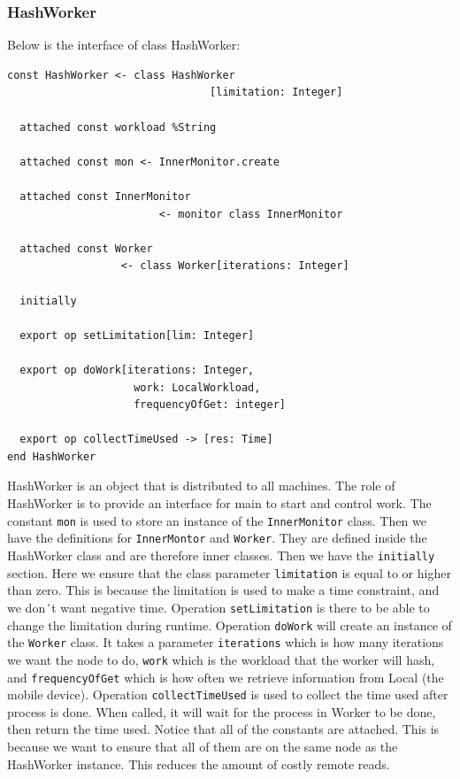 \subsubsection{HashWorker}
Below is the interface of class HashWorker:
\begin{lstlisting}[language=emerald]
const HashWorker <- class HashWorker
                                [limitation: Integer]
  
  attached const workload %String

  attached const mon <- InnerMonitor.create

  attached const InnerMonitor 
                        <- monitor class InnerMonitor

  attached const Worker
                  <- class Worker[iterations: Integer]

  initially

  export op setLimitation[lim: Integer]
  
  export op doWork[iterations: Integer, 
                    work: LocalWorkload, 
                    frequencyOfGet: integer]

  export op collectTimeUsed -> [res: Time]
end HashWorker
\end{lstlisting}
HashWorker is an object that is distributed to all machines. The role of HashWorker is to provide an interface for main to start and control work. The constant \verb|mon| is used to store an instance of the \verb|InnerMonitor| class. Then we have the definitions for \verb|InnerMontor| and \verb|Worker|. They are defined inside the HashWorker class and are therefore inner classes. Then we have the \verb|initially| section. Here we ensure that the class parameter \verb|limitation| is equal to or higher than zero. This is because the limitation is used to make a time constraint, and we don´t want negative time. Operation \verb|setLimitation| is there to be able to change the limitation during runtime. Operation \verb|doWork| will create an instance of the \verb|Worker| class. It takes a parameter \verb|iterations| which is how many iterations we want the node to do, \verb|work| which is the workload that the worker will hash, and \verb|frequencyOfGet| which is how often we retrieve information from Local (the mobile device). Operation \verb|collectTimeUsed| is used to collect the time used after process is done. When called, it will wait for the process in Worker to be done, then return the time used.
Notice that all of the constants are attached. This is because we want to ensure that all of them are on the same node as the HashWorker instance. This reduces the amount of costly remote reads.




